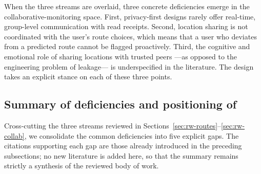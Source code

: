 \documentclass[a4paper,fleqn]{cas-sc}
\begin{document}
	When the three streams are overlaid, three concrete deficiencies emerge in the collaborative-monitoring space. First, privacy-first designs rarely offer real-time, group-level communication with read receipts. Second, location sharing is not coordinated with the user's route choices, which means that a user who deviates from a predicted route cannot be flagged proactively. Third, the cognitive and emotional role of sharing locations with trusted peers ---as opposed to the engineering problem of leakage--- is underspecified in the literature. The \RUTAI{} design takes an explicit stance on each of these three points.
	
	\subsection{Summary of deficiencies and positioning of \RUTAI{}}\label{sec:rw-summary}
	
	Cross-cutting the three streams reviewed in Sections~\ref{sec:rw-routes}--\ref{sec:rw-collab}, we consolidate the common deficiencies into five explicit gaps. The citations supporting each gap are those already introduced in the preceding subsections; no new literature is added here, so that the summary remains strictly a synthesis of the reviewed body of work.
	
\end{document}
